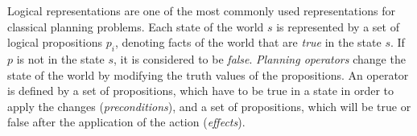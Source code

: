 


\noindent Logical representations are one of the most commonly used representations for classical planning problems. Each state of the world $s$ is represented by a set of logical propositions $p_i$, denoting facts of the world that are \textit{true} in the state $s$. If $p$ is not in the state $s$, it is considered to be \textit{false}.
\textit{Planning operators} change the state of the world by modifying the truth values of the propositions. An operator is defined by a set of propositions, which have to be true in a state in order to apply the changes (\textit{preconditions}), and a set of propositions, which will be true or false after the application of the action (\textit{effects}).

